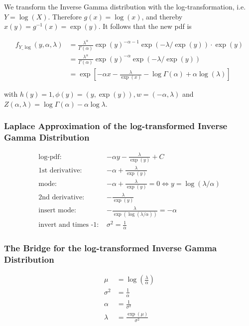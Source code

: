 We transform the Inverse Gamma distribution with the log-transformation, i.e. $Y = \log(X)$. Therefore $g(x) = \log(x)$, and thereby $x(y) = g^{-1}(x) = \exp(y)$. It follows that the new pdf is 

\begin{align}
	f_{Y\_\log}(y, \alpha, \lambda) &= \frac{\lambda^{\alpha}}{\Gamma(\alpha)} \exp(y)^{-\alpha-1} \exp(-\lambda/\exp(y)) \cdot \exp(y) \\
	&=  \frac{\lambda^{\alpha}}{\Gamma(\alpha)} \exp(y)^{-\alpha} \exp(-\lambda/\exp(y)) \\
	&= \exp\left[-\alpha x - \frac{\lambda}{\exp(x)} - \log\Gamma(\alpha) + \alpha\log(\lambda)\right]
	\label{eq:inv_gamma_trans_pdf}
\end{align}


with $h(y) = 1, \phi(y) = (y, \exp(y)), w=(-\alpha, \lambda)$ and $Z(\alpha, \lambda) = \log\Gamma(\alpha) - \alpha \log \lambda$.

\subsubsection{Laplace Approximation of the log-transformed Inverse Gamma Distribution}


\begin{align*}
\text{log-pdf: } &-\alpha y - \frac{\lambda}{\exp(y)} + C \\
\text{1st derivative: }&  -\alpha + \frac{\lambda}{\exp(y)}\\
\text{mode: }&  -\alpha + \frac{\lambda}{\exp(y)} = 0 \Leftrightarrow y = \log(\lambda/\alpha)\\
\text{2nd derivative: }&  -\frac{\lambda}{\exp(y)}\\
\text{insert mode: }&  -\frac{\lambda}{\exp(\log(\lambda/\alpha))} = -\alpha\\
\text{invert and times -1: }&\sigma^2 = \frac{1}{\alpha}
\end{align*}

\subsubsection{The Bridge for the log-transformed Inverse Gamma Distribution}

\begin{align}
	\mu &= \log\left(\frac{\lambda}{\alpha}\right) \\
	\sigma^2 &= \frac{1}{\alpha} \\
	\alpha &= \frac{1}{\sigma^2}\\
	\lambda &= \frac{\exp(\mu)}{\sigma^2}\\
\end{align}

